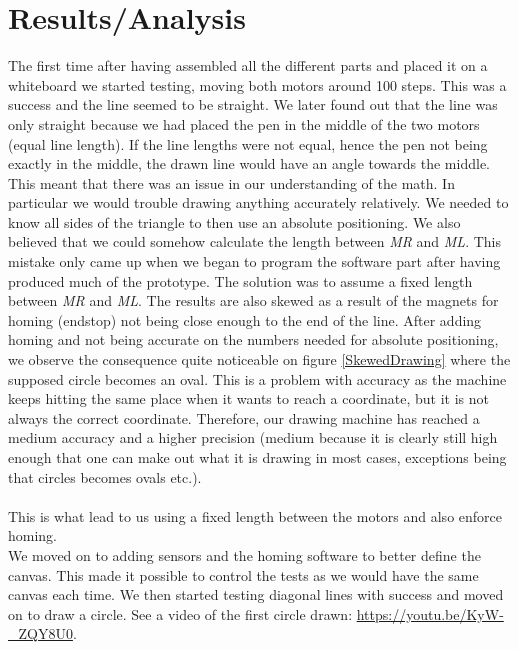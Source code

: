 \section{Results/Analysis}
The first time after having assembled all the different parts and placed it on a whiteboard we started testing, moving both motors around 100 steps. This was a success and the line seemed to be straight. We later found out that the line was only straight because we had placed the pen in the middle of the two motors (equal line length). If the line lengths were not equal, hence the pen not being exactly in the middle, the drawn line would have an angle towards the middle. This meant that there was an issue in our understanding of the math. In particular we would trouble drawing anything accurately relatively. We needed to know all sides of the triangle to then use an absolute positioning. We also believed that we could somehow calculate the length between {\it MR} and {\it ML}. This mistake only came up when we began to program the software part after having produced much of the prototype. The solution was to assume a fixed length between {\it MR} and {\it ML}. The results are also skewed as a result of the magnets for homing (endstop) not being close enough to the end of the line. After adding homing and not being accurate on the numbers needed for absolute positioning, we observe the consequence quite noticeable on figure \ref{SkewedDrawing} where the supposed circle becomes an oval. This is a problem with accuracy as the machine keeps hitting the same place when it wants to reach a coordinate, but it is not always the correct coordinate. Therefore, our drawing machine has reached a medium accuracy and a higher precision (medium because it is clearly still high enough that one can make out what it is drawing in most cases, exceptions being that circles becomes ovals etc.).
\\\\
This is what lead to us using a fixed length between the motors and also enforce homing. \\ %
We moved on to adding sensors and the homing software to better define the canvas. This made it possible to control the tests as we would have the same canvas each time. We then started testing diagonal lines with success and moved on to draw a circle. See a video of the first circle drawn: \url{https://youtu.be/KyW-_ZQY8U0}.\\
